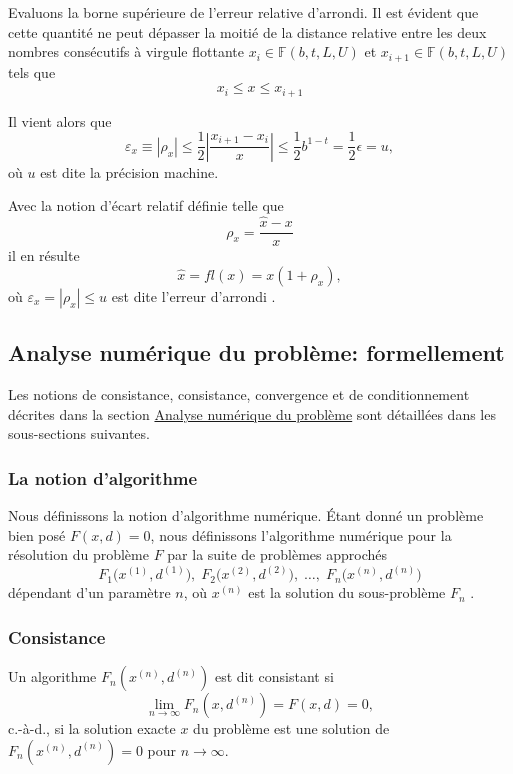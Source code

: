 \documentclass[
	a4paper, %
	10pt, %
	unnumberedsections, %
	twoside, %
]{LTJournalArticle}
\begin{document}
Evaluons la borne supérieure de l'erreur relative d'arrondi. Il est
évident que cette quantité ne peut dépasser la moitié de la distance relative
entre les deux nombres consécutifs à virgule flottante $x_i \in
    \mathbb{F}(b,t,L,U)$ et $x_{i+1} \in \mathbb{F}(b,t,L,U)$ tels que
\begin{equation}
    x_i \le x \le x_{i+1}
\end{equation}

Il vient alors que
\begin{equation}
    \varepsilon_x \equiv |\rho_x|
    \le \frac{1}{2} \left| \frac{x_{i+1} - x_i}{x} \right|
    \le \frac{1}{2} b^{1-t}
    = \frac{1}{2} \epsilon
    = u,
\end{equation}
où $u$ est dite la précision machine.

Avec la notion d'écart relatif définie telle que
\begin{equation}
    \rho_x = \frac{\hat{x} - x}{x}
\end{equation}
il en résulte
\begin{equation}
    \hat{x} = fl(x) = x(1 + \rho_x),
\end{equation}
où $\varepsilon_x = |\rho_x| \le u$ est dite l'erreur d'arrondi \cite{Marteen:2022}.


\subsection{Analyse numérique du problème: formellement}
\label{annex:ananum}

Les notions de consistance, consistance, convergence et de conditionnement décrites dans
la section \hyperref[sec:ananum]{Analyse numérique du problème} sont détaillées dans les sous-sections suivantes.

\subsubsection{La notion d'algorithme}
Nous définissons la notion d'algorithme numérique. Étant donné un problème bien posé $F(x, d) = 0$, nous définissons l’algorithme numérique pour la résolution du problème $F$ par la suite de problèmes approchés
\[
    F_1\big(x^{(1)}, d^{(1)}\big), \; F_2\big(x^{(2)}, d^{(2)}\big), \; \ldots, \; F_n\big(x^{(n)}, d^{(n)}\big)
\]
dépendant d'un paramètre $n$, où $x^{(n)}$ est la solution du sous-problème $F_n$ \cite{Marteen:2022}.


\subsubsection{Consistance}
Un algorithme $F_n(x^{(n)}, d^{(n)})$ est dit consistant si
\begin{equation}
    \lim_{n \to \infty} F_n(x, d^{(n)}) = F(x, d) = 0,
\end{equation}
c.-à-d., si la solution exacte $x$ du problème est une solution de
$F_n(x^{(n)}, d^{(n)}) = 0$ pour $n \to \infty$.
\end{document}
